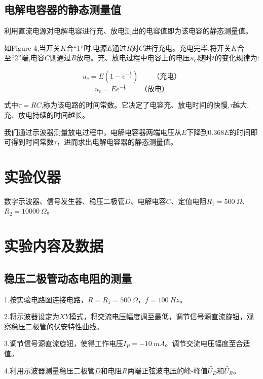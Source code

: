 \documentclass{article}
\begin{document}
\subsection{电解电容器的静态测量值}
利用直流电源对电解电容进行充、放电测出的电容值即为该电容的静态测量值。

如Figure 4,当开关$K$合“1”时,电源$E$通过$R$对$C$进行充电。充电完毕,将开关$K$合至“2”端,电容$C$则通过$R$放电。充、放电过程中电容上的电压$u_C$随时$t$的变化规律为:

$$
u_c=E(1-e^{-\frac{t}{\tau}})\qquad （充电）
$$
$$
u_c=Ee^{-\frac{t}{\tau}}\qquad （放电）
$$

式中$\tau=RC$,称为该电路的时间常数。它决定了电容充、放电时间的快慢,$\tau$越大,充、放电持续的时间越长。

我们通过示波器测量放电过程中，电解电容器两端电压从$E$下降到$0.368E$的时间即可得到时间常数$\tau$，进而求出电解电容器的静态测量值。

\section{实验仪器}
数字示波器、信号发生器、稳压二极管$D$、电解电容$C$、定值电阻$R_1=500\ \Omega$、$R_2=10000\ \Omega$。

\section{实验内容及数据}
\subsection{稳压二极管动态电阻的测量}
1.按实验电路图连接电路，$R=R_1=500\ \Omega$，$f=100\ Hz$。

2.将示波器设定为$XY$模式，将交流电压幅度调至最低，调节信号源直流旋钮，观察稳压二极管的伏安特性曲线。

3.调节信号源直流旋钮，使得工作电压$I_P=-10\ mA$。调节交流电压幅度至合适值。

4.利用示波器测量稳压二极管$D$和电阻$R$两端正弦波电压的峰-峰值$\widetilde{U_D}$和$\widetilde{U_R}$。
\end{document}
